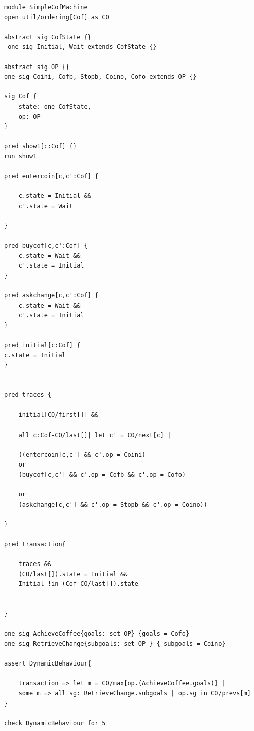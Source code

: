 \documentclass[a4paper,10pt]{report}
\begin{document}
\begin{verbatim}
module SimpleCofMachine
open util/ordering[Cof] as CO 

abstract sig CofState {}
 one sig Initial, Wait extends CofState {}

abstract sig OP {}
one sig Coini, Cofb, Stopb, Coino, Cofo extends OP {}

sig Cof {
	state: one CofState,
	op: OP
}

pred show1[c:Cof] {}
run show1

pred entercoin[c,c':Cof] {   

	c.state = Initial &&     
	c'.state = Wait          

}

pred buycof[c,c':Cof] {
	c.state = Wait &&
	c'.state = Initial
}

pred askchange[c,c':Cof] {
	c.state = Wait &&
	c'.state = Initial
}

pred initial[c:Cof] {
c.state = Initial
}


pred traces {

	initial[CO/first[]] &&  

	all c:Cof-CO/last[]| let c' = CO/next[c] |  
												 
	((entercoin[c,c'] && c'.op = Coini) 
	or
	(buycof[c,c'] && c'.op = Cofb && c'.op = Cofo) 
		                                            
	or
	(askchange[c,c'] && c'.op = Stopb && c'.op = Coino))  

}

pred transaction{

	traces &&  
	(CO/last[]).state = Initial &&
	Initial !in (Cof-CO/last[]).state  
								        

}

one sig AchieveCoffee{goals: set OP} {goals = Cofo}
one sig RetrieveChange{subgoals: set OP } { subgoals = Coino}

assert DynamicBehaviour{

	transaction => let m = CO/max[op.(AchieveCoffee.goals)] |
	some m => all sg: RetrieveChange.subgoals | op.sg in CO/prevs[m]
}

check DynamicBehaviour for 5
\end{verbatim}
\end{document}
